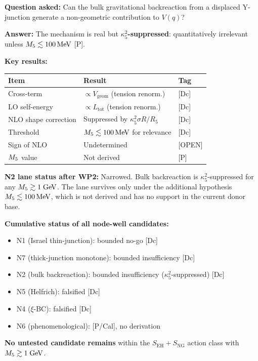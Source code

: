 \begin{resultbox}[title=N2 WP2 Summary]
\textbf{Question asked:} Can the bulk gravitational backreaction from
a displaced Y-junction generate a non-geometric contribution to $V(q)$?

\textbf{Answer:} The mechanism is real but
\textbf{$\kappa_5^2$-suppressed}: quantitatively irrelevant unless
$M_5 \lesssim 100\,\mathrm{MeV}$ [P].

\textbf{Key results:}
\begin{center}
\begin{tabular}{lll}
\toprule
\textbf{Item} & \textbf{Result} & \textbf{Tag} \\
\midrule
Cross-term & $\propto V_{\mathrm{geom}}$ (tension renorm.) & [Dc] \\
LO self-energy & $\propto L_{\mathrm{tot}}$ (tension renorm.) & [Dc] \\
NLO shape correction & Suppressed by $\kappa_5^2 \sigma R / R_5$ & [Dc] \\
Threshold & $M_5 \lesssim 100\,\mathrm{MeV}$ for relevance & [Dc] \\
Sign of NLO & Undetermined & [OPEN] \\
$M_5$ value & Not derived & [P] \\
\bottomrule
\end{tabular}
\end{center}

\textbf{N2 lane status after WP2:} Narrowed. Bulk backreaction is
$\kappa_5^2$-suppressed for any $M_5 \gtrsim 1\;\mathrm{GeV}$.
The lane survives only under the additional hypothesis
$M_5 \lesssim 100\,\mathrm{MeV}$, which is not derived and has no support
in the current donor base.

\textbf{Cumulative status of all node-well candidates:}
\begin{itemize}
    \item N1 (Israel thin-junction): bounded no-go [Dc]
    \item N7 (thick-junction monotone): bounded insufficiency [Dc]
    \item N2 (bulk backreaction): bounded insufficiency
          ($\kappa_5^2$-suppressed) [Dc]
    \item N5 (Helfrich): falsified [Dc]
    \item N4 ($\xi$-BC): falsified [Dc]
    \item N6 (phenomenological): [P/Cal], no derivation
\end{itemize}

\textbf{No untested candidate remains} within the
$S_{\mathrm{EH}} + S_{\mathrm{NG}}$ action class with
$M_5 \gtrsim 1\;\mathrm{GeV}$.


\end{resultbox}
